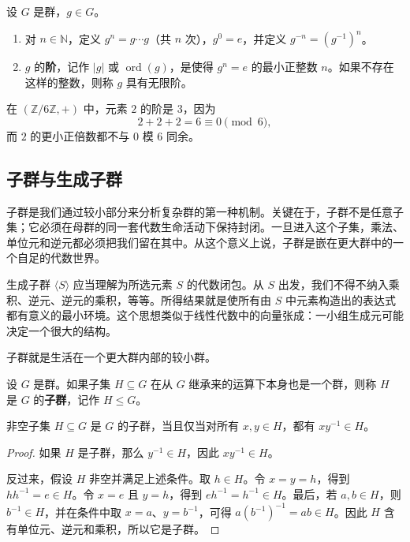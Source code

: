 \begin{definition}[幂与元素的阶]
设 $G$ 是群，$g\in G$。
\begin{enumerate}
    \item 对 $n\in\mathbb{N}$，定义 $g^n=g\cdots g$（共 $n$ 次），$g^0=e$，并定义 $g^{-n}=(g^{-1})^n$。
    \item $g$ 的\textbf{阶}，记作 $|g|$ 或 $\operatorname{ord}(g)$，是使得 $g^n=e$ 的最小正整数 $n$。如果不存在这样的整数，则称 $g$ 具有无限阶。
\end{enumerate}
\end{definition}

\begin{example}
在 $(\mathbb{Z}/6\mathbb{Z},+)$ 中，元素 $2$ 的阶是 $3$，因为
\[
    2+2+2=6\equiv 0\pmod 6,
\]
而 $2$ 的更小正倍数都不与 $0$ 模 $6$ 同余。
\end{example}

\subsection{子群与生成子群}


子群是我们通过较小部分来分析复杂群的第一种机制。关键在于，子群不是任意子集；它必须在母群的同一套代数生命活动下保持封闭。一旦进入这个子集，乘法、单位元和逆元都必须把我们留在其中。从这个意义上说，子群是嵌在更大群中的一个自足的代数世界。

生成子群 $\langle S\rangle$ 应当理解为所选元素 $S$ 的代数闭包。从 $S$ 出发，我们不得不纳入乘积、逆元、逆元的乘积，等等。所得结果就是使所有由 $S$ 中元素构造出的表达式都有意义的最小环境。这个思想类似于线性代数中的向量张成：一小组生成元可能决定一个很大的结构。

子群就是生活在一个更大群内部的较小群。

\begin{definition}[子群]
设 $G$ 是群。如果子集 $H\subseteq G$ 在从 $G$ 继承来的运算下本身也是一个群，则称 $H$ 是 $G$ 的\textbf{子群}，记作 $H\leq G$。
\end{definition}

\begin{lemma}[子群判别法]
非空子集 $H\subseteq G$ 是 $G$ 的子群，当且仅当对所有 $x,y\in H$，都有 $xy^{-1}\in H$。
\end{lemma}

\begin{proof}
如果 $H$ 是子群，那么 $y^{-1}\in H$，因此 $xy^{-1}\in H$。

反过来，假设 $H$ 非空并满足上述条件。取 $h\in H$。令 $x=y=h$，得到 $hh^{-1}=e\in H$。令 $x=e$ 且 $y=h$，得到 $eh^{-1}=h^{-1}\in H$。最后，若 $a,b\in H$，则 $b^{-1}\in H$，并在条件中取 $x=a$、$y=b^{-1}$，可得 $a(b^{-1})^{-1}=ab\in H$。因此 $H$ 含有单位元、逆元和乘积，所以它是子群。
\end{proof}

